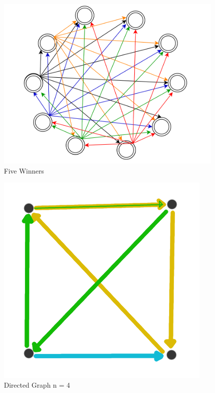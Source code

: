 \documentclass[12pt]{article}
\begin{document}
\begin{figure}[p]
 \centering
 \includegraphics[scale=0.5]{fig4}
 \caption{Five Winners}
\end{figure}

\begin{figure}[p]
 \centering
 \includegraphics[scale=0.5]{fig8}
 \caption{Directed Graph n = 4}
\end{figure}
\end{document}
